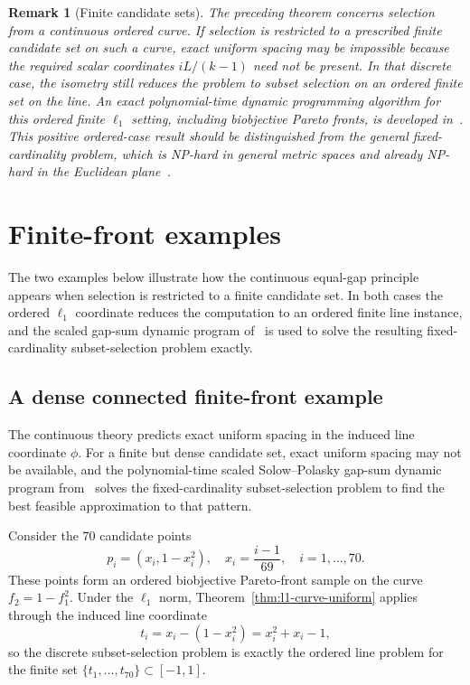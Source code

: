\documentclass[12pt,a4paper]{article}
\newtheorem{remark}{Remark}
\begin{document}
\begin{remark}[Finite candidate sets]
The preceding theorem concerns selection from a continuous ordered curve.  If selection is restricted to a prescribed finite candidate set on such a curve, exact uniform spacing may be impossible because the required scalar coordinates $iL/(k-1)$ need not be present.  In that discrete case, the isometry still reduces the problem to subset selection on an ordered finite set on the line.  An exact polynomial-time dynamic programming algorithm for this ordered finite $\ell_1$ setting, including biobjective Pareto fronts, is developed in~\cite{Emmerich2026PolynomialTime}.  This positive ordered-case result should be distinguished from the general fixed-cardinality problem, which is NP-hard in general metric spaces and already NP-hard in the Euclidean plane~\cite{EmmerichPereverdievaDeutz2026Metric,EmmerichPereverdievaDeutz2026Plane}.
\end{remark}

\section{Finite-front examples}
\label{sec:finite-front-examples}

The two examples below illustrate how the continuous equal-gap principle appears when selection is restricted to a finite candidate set.  In both cases the ordered $\ell_1$ coordinate reduces the computation to an ordered finite line instance, and the scaled gap-sum dynamic program of~\cite{Emmerich2026PolynomialTime} is used to solve the resulting fixed-cardinality subset-selection problem exactly.

\subsection{A dense connected finite-front example}

The continuous theory predicts exact uniform spacing in the induced line coordinate $\phi$.  For a finite but dense candidate set, exact uniform spacing may not be available, and the polynomial-time scaled Solow--Polasky gap-sum dynamic program from~\cite{Emmerich2026PolynomialTime} solves the fixed-cardinality subset-selection problem to find the best feasible approximation to that pattern.

Consider the $70$ candidate points
\[
 p_i=(x_i,1-x_i^2),\quad x_i=\frac{i-1}{69},\quad i=1,\ldots,70.
\]
These points form an ordered biobjective Pareto-front sample on the curve $f_2=1-f_1^2$.  Under the $\ell_1$ norm, Theorem~\ref{thm:l1-curve-uniform} applies through the induced line coordinate
\[
 t_i=x_i-(1-x_i^2)=x_i^2+x_i-1,
\]
so the discrete subset-selection problem is exactly the ordered line problem for the finite set $\{t_1,\ldots,t_{70}\}\subset[-1,1]$.
\end{document}
